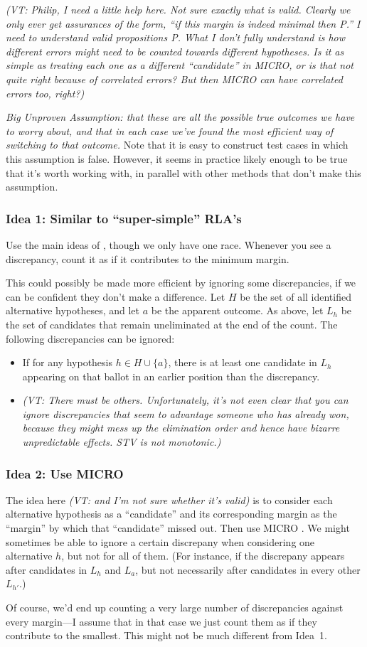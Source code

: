 \documentclass[10pt,a4paper]{article}
\newcommand{\VTNote}[1]{{\it(VT: #1)}}
\begin{document}
\VTNote{Philip, I need a little help here.  Not sure exactly what is valid.  Clearly we only ever get assurances of the form, ``if this margin is indeed minimal then P.''  I need to understand valid propositions P.   What I don't fully understand is how different errors might need to be counted towards different hypotheses.  Is it as simple as treating each one as a different ``candidate'' in MICRO, or is that not quite right because of correlated errors?  But then MICRO can have correlated errors too, right?}

\emph{Big Unproven Assumption: that these are all the possible true outcomes we have to worry about, and that in each case we've found the most efficient way of switching to that outcome.}  Note that it is easy to construct test cases in which this assumption is false.  However, it seems in practice likely enough to be true that it's worth working with, in parallel with other methods that don't make this assumption.

\subsubsection{Idea 1: Similar to ``super-simple'' RLA's}
Use the main ideas of \cite{stark2010super}, though we only have one race.  Whenever you see a discrepancy, count it as if it contributes to the minimum margin.

This could possibly be made more efficient by ignoring some discrepancies, if we can be confident they don't make a difference.
Let $H$ be the set of all identified alternative hypotheses, and let $a$ be the apparent outcome.  As above, let $L_h$ be the set of candidates that remain uneliminated at the end of the count.  The following discrepancies can be ignored:
\begin{itemize}
\item If for any hypothesis $h \in H \cup \{a \}$, there is at least one candidate in $L_h$ appearing on that ballot in an earlier position than the discrepancy.
\item \VTNote{There must be others.  Unfortunately, it's not even clear that you can ignore discrepancies that seem to advantage someone who has already won, because they might mess up the elimination order and hence have bizarre unpredictable effects.  STV is not monotonic.}
\end{itemize}



\subsubsection{Idea 2: Use MICRO}
The idea here \VTNote{ and I'm not sure whether it's valid} is to consider each alternative hypothesis as a ``candidate'' and its corresponding margin as the ``margin'' by which that ``candidate'' missed out.  Then use MICRO \cite{stark2008sharper}.  We might sometimes be able to ignore a certain discrepany when considering one alternative $h$, but not for all of them.  (For instance, if the discrepany appears after candidates in $L_h$ and $L_a$, but not necessarily after candidates in every other $L_{h'}$.)  

Of course, we'd end up counting a very large number of discrepancies against every margin---I assume that in that case we just count them as if they contribute to the smallest.  This might not be much different from Idea~1. 



\end{document}
